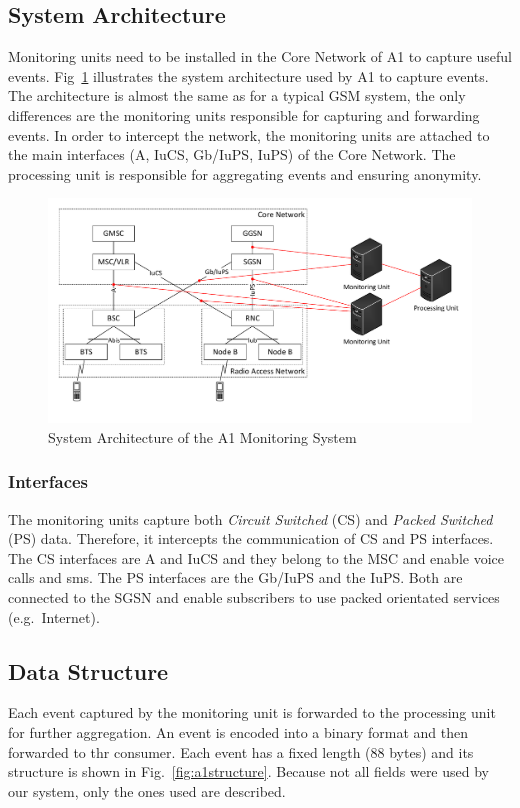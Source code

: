 \documentclass[master,english]{hgbthesis}
\begin{document}
\subsection{System Architecture}
Monitoring units need to be installed in the Core Network of A1 to capture useful events. Fig~\ref{fig:A1Network} illustrates the system architecture used by A1 to capture events. The architecture is almost the same as for a typical GSM system, the only differences are the monitoring units responsible for capturing and forwarding events.
In order to intercept the network, the monitoring units are attached to the main interfaces (A, IuCS, Gb/IuPS, IuPS) of the Core Network. The processing unit is responsible for aggregating events and ensuring anonymity.
\begin{figure}
	\centering
	\includegraphics[width=\linewidth]{./images/A1Network}
	\caption{System Architecture of the A1 Monitoring System}
	\label{fig:A1Network}
\end{figure}
\subsubsection{Interfaces}
The monitoring units capture both \emph{Circuit Switched} (CS) and \emph{Packed Switched} (PS) data. Therefore, it intercepts the communication of CS and PS interfaces. The CS interfaces are A and IuCS and they belong to the MSC and enable voice calls and sms. The PS interfaces are the Gb/IuPS and the IuPS. Both are connected to the SGSN and enable subscribers to use packed orientated services (e.g.\ Internet).
\subsection{Data Structure}
\label{sec:dataa1}
Each event captured by the monitoring unit is forwarded to the processing unit for further aggregation. An event is encoded into a binary format and then forwarded to thr consumer. Each event has a fixed length (88 bytes) and its structure is shown in Fig.~\ref{fig:a1structure}.
Because not all fields were used by our system, only the ones used are described.
\end{document}

